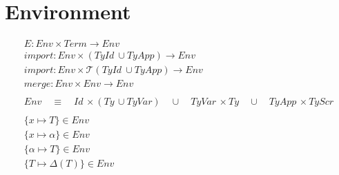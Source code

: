 \documentclass[10pt]{article}
\newcommand\Tup{\mathcal{T}}
\newcommand\Env{\textit{Env}}
\newcommand\Term{\textit{Term}}
\newcommand\Id{\textit{Id}}
\newcommand\Ty{\textit{Ty}}
\newcommand\TyId{\textit{TyId}}
\newcommand\TyApp{\textit{TyApp}}
\newcommand\TyVar{\textit{TyVar}}
\newcommand\TyScr{\textit{TyScr}}
\begin{document}
\clearpage
\section*{Environment}

\begin{table}[!h]
  \begin{gather*}
    E : \Env \times \Term \rightarrow \Env
    \\[0.5em]
    import : \Env \times (\TyId\ \cup \TyApp) \rightarrow \Env \\
    import : \Env \times \Tup(\TyId\ \cup \TyApp) \rightarrow \Env
    \\[0.5em]
    merge : \Env \times \Env \rightarrow \Env \\
    \\
    Env \quad \equiv \quad
      \Id\, \times (\Ty\, \cup \TyVar) \quad \cup \quad
      \TyVar\, \times \Ty \quad \cup \quad
      \TyApp\, \times \TyScr\\
    \\
    \{ x \mapsto T \} \in \Env \\
    \{ x \mapsto \alpha \} \in \Env \\
    \{ \alpha \mapsto T \} \in \Env \\
    \{ T \mapsto \Delta(T) \} \in \Env \\
  \end{gather*}

  \vspace{-2em}


\end{table}
\end{document}

